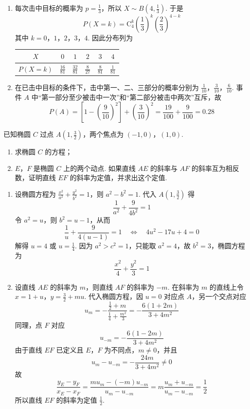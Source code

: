 \begin{solution}
\begin{enumerate}
\item 每次击中目标的概率为 \(p=\frac13\)，所以 \(X\sim B\left(4,\frac13\right)\). 于是
\[
P(X=k)=\mathrm C_4^k\left(\frac13\right)^k\left(\frac23\right)^{4-k}
\]
其中 \(k=0\)，\(1\)，\(2\)，\(3\)，\(4\).
因此分布列为
\begin{center}
\begin{tabular}{c|ccccc}
\(X\)&\(0\)&\(1\)&\(2\)&\(3\)&\(4\)\\ \hline
\(P(X=k)\)&\(\frac{16}{81}\)&\(\frac{32}{81}\)&\(\frac{8}{27}\)&\(\frac{8}{81}\)&\(\frac{1}{81}\)
\end{tabular}
\end{center}
\item 在已击中目标的条件下，击中第一、二、三部分的概率分别为 \(\frac1{10}\)，\(\frac3{10}\)，\(\frac6{10}\). 事件 \(A\) 中“第一部分至少被击中一次”和“第二部分被击中两次”互斥，故
\[
P(A)=\left[1-\left(\frac9{10}\right)^2\right]+\left(\frac3{10}\right)^2=\frac{19}{100}+\frac9{100}=0.28
\]
\end{enumerate}
\end{solution}

\begin{problem}
已知椭圆 \(C\) 过点 \(A\left(1, \frac{3}{2}\right)\)，两个焦点为 \((-1,0)\)，\((1,0)\).
\begin{enumerate}
\item 求椭圆 \(C\) 的方程；
\item \(E\)，\(F\) 是椭圆 \(C\) 上的两个动点. 如果直线 \(AE\) 的斜率与 \(AF\) 的斜率互为相反数，证明直线 \(EF\) 的斜率为定值，并求出这个定值.
\end{enumerate}
\end{problem}

\begin{solution}
\begin{enumerate}
\item 设椭圆方程为 \(\frac{x^2}{a^2}+\frac{y^2}{b^2}=1\)，则 \(a^2-b^2=1\). 代入 \(A\left(1,\frac32\right)\) 得
\[
\frac1{a^2}+\frac{9}{4b^2}=1
\]
令 \(a^2=u\)，则 \(b^2=u-1\)，从而
\[
\frac1u+\frac{9}{4(u-1)}=1\quad\Longleftrightarrow\quad 4u^2-17u+4=0
\]
解得 \(u=4\) 或 \(u=\frac14\). 因为 \(a^2>c^2=1\)，只能取 \(a^2=4\)，故 \(b^2=3\)，椭圆方程为
\[
\frac{x^2}{4}+\frac{y^2}{3}=1
\]
\item 设直线 \(AE\) 的斜率为 \(m\)，则直线 \(AF\) 的斜率为 \(-m\). 在斜率为 \(m\) 的直线上令 \(x=1+u\)，\(y=\frac32+mu\).
代入椭圆方程，因 \(u=0\) 对应点 \(A\)，另一个交点对应
\[
u_m=-\frac{\frac12+m}{\frac14+\frac{m^2}{3}}=-\frac{6(1+2m)}{3+4m^2}
\]
同理，点 \(F\) 对应
\[
u_{-m}=-\frac{6(1-2m)}{3+4m^2}
\]
由于直线 \(EF\) 已定义且 \(E\)，\(F\) 为不同点，\(m\ne0\)，并且
\[
u_m-u_{-m}=-\frac{24m}{3+4m^2}\ne0
\]
故
\[
\frac{y_E-y_F}{x_E-x_F}=\frac{m u_m-(-m)u_{-m}}{u_m-u_{-m}}=m\frac{u_m+u_{-m}}{u_m-u_{-m}}=\frac12
\]
所以直线 \(EF\) 的斜率为定值 \(\frac12\).
\end{enumerate}
\end{solution}

